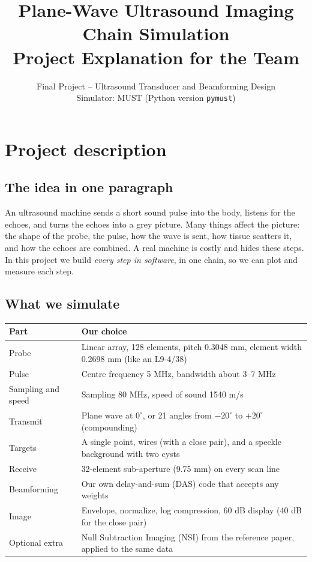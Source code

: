 \documentclass[11pt,a4paper]{article}
\title{Plane-Wave Ultrasound Imaging Chain Simulation\\[2pt]
\large Project Explanation for the Team}
\author{Final Project -- Ultrasound Transducer and Beamforming Design\\
Simulator: MUST (Python version \texttt{pymust})}
\date{}
\begin{document}
\maketitle
\tableofcontents
\newpage

\section{Project description}

\subsection{The idea in one paragraph}
An ultrasound machine sends a short sound pulse into the body, listens for the echoes, and turns the echoes into a grey picture. Many things affect the picture: the shape of the probe, the pulse, how the wave is sent, how tissue scatters it, and how the echoes are combined. A real machine is costly and hides these steps. In this project we build \emph{every step in software}, in one chain, so we can plot and measure each step.

\subsection{What we simulate}
\begin{center}
\begin{tabular}{@{}p{4.0cm}p{10.5cm}@{}}
\toprule
\textbf{Part} & \textbf{Our choice}\\
\midrule
Probe & Linear array, 128 elements, pitch 0.3048 mm, element width 0.2698 mm (like an L9-4/38)\\
Pulse & Centre frequency 5 MHz, bandwidth about 3--7 MHz\\
Sampling and speed & Sampling 80 MHz, speed of sound 1540 m/s\\
Transmit & Plane wave at $0^\circ$, or 21 angles from $-20^\circ$ to $+20^\circ$ (compounding)\\
Targets & A single point, wires (with a close pair), and a speckle background with two cysts\\
Receive & 32-element sub-aperture (9.75 mm) on every scan line\\
Beamforming & Our own delay-and-sum (DAS) code that accepts any weights\\
Image & Envelope, normalize, log compression, 60 dB display (40 dB for the close pair)\\
Optional extra & Null Subtraction Imaging (NSI) from the reference paper, applied to the same data\\
\bottomrule
\end{tabular}
\end{center}
\end{document}
